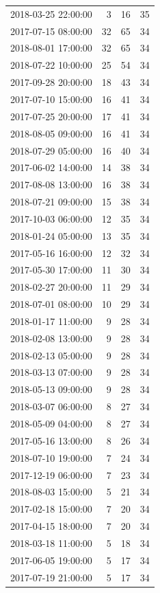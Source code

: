 \begin{tabular}{lrrr}
2018-03-25 22:00:00 & 3 & 16 & 35 \\
2017-07-15 08:00:00 & 32 & 65 & 34 \\
2018-08-01 17:00:00 & 32 & 65 & 34 \\
2018-07-22 10:00:00 & 25 & 54 & 34 \\
2017-09-28 20:00:00 & 18 & 43 & 34 \\
2017-07-10 15:00:00 & 16 & 41 & 34 \\
2017-07-25 20:00:00 & 17 & 41 & 34 \\
2018-08-05 09:00:00 & 16 & 41 & 34 \\
2018-07-29 05:00:00 & 16 & 40 & 34 \\
2017-06-02 14:00:00 & 14 & 38 & 34 \\
2017-08-08 13:00:00 & 16 & 38 & 34 \\
2018-07-21 09:00:00 & 15 & 38 & 34 \\
2017-10-03 06:00:00 & 12 & 35 & 34 \\
2018-01-24 05:00:00 & 13 & 35 & 34 \\
2017-05-16 16:00:00 & 12 & 32 & 34 \\
2017-05-30 17:00:00 & 11 & 30 & 34 \\
2018-02-27 20:00:00 & 11 & 29 & 34 \\
2018-07-01 08:00:00 & 10 & 29 & 34 \\
2018-01-17 11:00:00 & 9 & 28 & 34 \\
2018-02-08 13:00:00 & 9 & 28 & 34 \\
2018-02-13 05:00:00 & 9 & 28 & 34 \\
2018-03-13 07:00:00 & 9 & 28 & 34 \\
2018-05-13 09:00:00 & 9 & 28 & 34 \\
2018-03-07 06:00:00 & 8 & 27 & 34 \\
2018-05-09 04:00:00 & 8 & 27 & 34 \\
2017-05-16 13:00:00 & 8 & 26 & 34 \\
2018-07-10 19:00:00 & 7 & 24 & 34 \\
2017-12-19 06:00:00 & 7 & 23 & 34 \\
2018-08-03 15:00:00 & 5 & 21 & 34 \\
2017-02-18 15:00:00 & 7 & 20 & 34 \\
2017-04-15 18:00:00 & 7 & 20 & 34 \\
2018-03-18 11:00:00 & 5 & 18 & 34 \\
2017-06-05 19:00:00 & 5 & 17 & 34 \\
2017-07-19 21:00:00 & 5 & 17 & 34 \\

\end{tabular}
